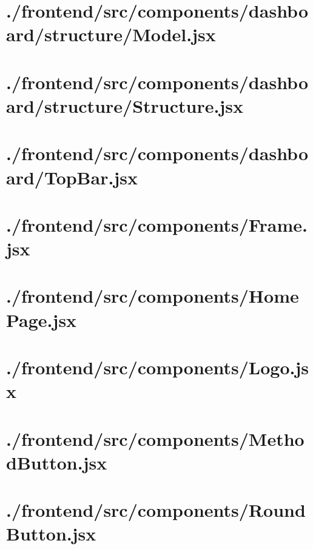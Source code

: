 \documentclass[11pt]{informatics-report}
\begin{document}
\newpage
\section{./frontend/src/components/dashboard/structure/Model.jsx}


\newpage
\section{./frontend/src/components/dashboard/structure/Structure.jsx}


\newpage
\section{./frontend/src/components/dashboard/TopBar.jsx}


\newpage
\section{./frontend/src/components/Frame.jsx}


\newpage
\section{./frontend/src/components/HomePage.jsx}


\newpage
\section{./frontend/src/components/Logo.jsx}


\newpage
\section{./frontend/src/components/MethodButton.jsx}


\newpage
\section{./frontend/src/components/RoundButton.jsx}

\end{document}
